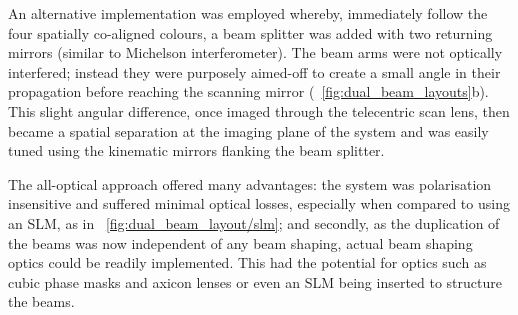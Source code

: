 An alternative implementation was employed whereby, immediately follow the four spatially co-aligned colours, a beam splitter was added with two returning mirrors (similar to Michelson interferometer).
The beam arms were not optically interfered; instead they were purposely aimed-off to create a small angle in their propagation before reaching the scanning mirror (\figurename~\ref{fig:dual_beam_layouts}b).
This slight angular difference, once imaged through the telecentric scan lens, then became a spatial separation at the imaging plane of the system and was easily tuned using the kinematic mirrors flanking the beam splitter.

The all-optical approach offered many advantages: the system was polarisation insensitive and suffered minimal optical losses, especially when compared to using an \gls{SLM}, as in \figurename~\ref{fig:dual_beam_layout/slm};  and secondly, as the duplication of the beams was now independent of any beam shaping, actual beam shaping optics could be readily implemented.
This had the potential for optics such as cubic phase masks and axicon lenses or even an \gls{SLM} being inserted to structure the beams.

